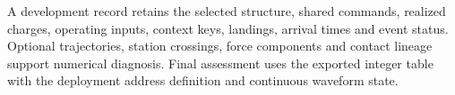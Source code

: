 A development record retains the selected structure, shared commands, realized charges, operating inputs, context keys, landings, arrival times and event status. Optional trajectories, station crossings, force components and contact lineage support numerical diagnosis. Final assessment uses the exported integer table with the deployment address definition and continuous waveform state.
